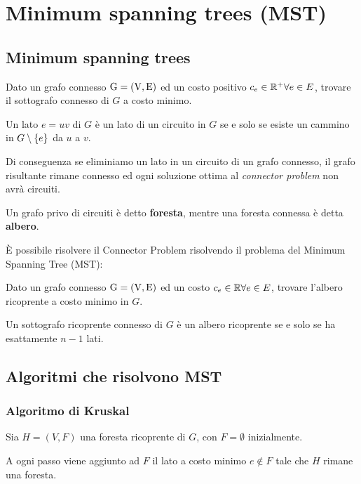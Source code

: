 \documentclass[\main/main.tex]{subfiles}
\begin{document}
\chapter{Minimum spanning trees (MST)}
\section{Minimum spanning trees}
\begin{problem}
Dato un grafo connesso \(\operatorname*{G=\left(V, E\right)} \) ed un costo positivo \(c_e \in \mathbb{R}^+ \forall e \in E\), trovare il sottografo connesso di \(G\) a costo minimo.
\end{problem}
\begin{lemma}
  Un lato \(e = uv\) di \(G\) è un lato di un circuito in \(G\) se e solo se esiste un cammino in \(G \setminus \left\{e\right\}\) da \(u\) a \(v\).
\end{lemma}
Di conseguenza se eliminiamo un lato in un circuito di un grafo connesso, il grafo risultante rimane connesso ed ogni soluzione ottima al \textit{connector problem} non avrà circuiti.
\begin{definition}
  Un grafo privo di circuiti è detto \textbf{foresta}, mentre una foresta connessa è detta \textbf{albero}.
\end{definition}
È possibile risolvere il Connector Problem risolvendo il problema del Minimum Spanning Tree (MST):
\begin{problem}
Dato un grafo connesso \(\operatorname*{G=\left(V, E\right)} \) ed un costo \(c_e \in \mathbb{R} \forall e \in E\), trovare l'albero ricoprente a costo minimo in \(G\).
\end{problem}
\begin{lemma}
  Un sottografo ricoprente connesso di \(G\) è un albero ricoprente se e solo se ha esattamente \(n -1\) lati.
\end{lemma}
\clearpage
\section{Algoritmi che risolvono MST}
\subsection{Algoritmo di Kruskal}
Sia \(H = (V, F)\) una foresta ricoprente di \(G\), con \(F=\emptyset \) inizialmente.

A ogni passo viene aggiunto ad \(F\) il lato a costo minimo \(e \not\in F\) tale che \(H\) rimane una foresta.
\end{document}
